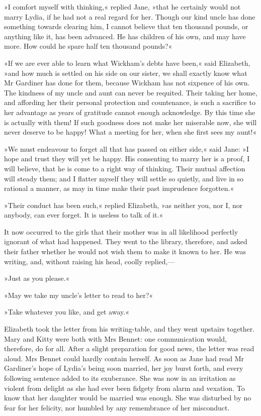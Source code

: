»I comfort myself with thinking,« replied Jane, »that he certainly would not marry Lydia, if he had not a real regard for her. Though our kind uncle has done something towards clearing him, I cannot believe that ten thousand pounds, or anything like it, has been advanced. He has children of his own, and may have more. How could he spare half ten thousand pounds?«

»If we are ever able to learn what Wickham's debts have been,« said Elizabeth, »and how much is settled on his side on our sister, we shall exactly know what Mr Gardiner has done for them, because Wickham has not sixpence of his own. The kindness of my uncle and aunt can never be requited. Their taking her home, and affording her their personal protection and countenance, is such a sacrifice to her advantage as years of gratitude cannot enough acknowledge. By this time she is actually with them! If such goodness does not make her miserable now, she will never deserve to be happy! What a meeting for her, when she first sees my aunt!«

»We must endeavour to forget all that has passed on either side,« said Jane: »I hope and trust they will yet be happy. His consenting to marry her is a proof, I will believe, that he is come to a right way of thinking. Their mutual affection will steady them; and I flatter myself they will settle so quietly, and live in so rational a manner, as may in time make their past imprudence forgotten.«

»Their conduct has been such,« replied Elizabeth, »as neither you, nor I, nor anybody, can ever forget. It is useless to talk of it.«

It now occurred to the girls that their mother was in all likelihood perfectly ignorant of what had happened. They went to the library, therefore, and asked their father whether he would not wish them to make it known to her. He was writing, and, without raising his head, coolly replied,—

»Just as you please.«

»May we take my uncle's letter to read to her?«

»Take whatever you like, and get away.«

Elizabeth took the letter from his writing-table, and they went upstairs together. Mary and Kitty were both with Mrs Bennet: one communication would, therefore, do for all. After a slight preparation for good news, the letter was read aloud. Mrs Bennet could hardly contain herself. As soon as Jane had read Mr Gardiner's hope of Lydia's being soon married, her joy burst forth, and every following sentence added to its exuberance. She was now in an irritation as violent from delight as she had ever been fidgety from alarm and vexation. To know that her daughter would be married was enough. She was disturbed by no fear for her felicity, nor humbled by any remembrance of her misconduct.

